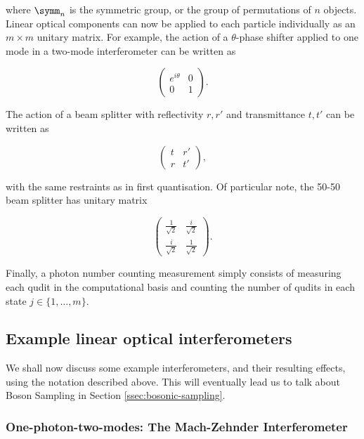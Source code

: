 \noindent where $\symm_n$ is the symmetric group, or the group of permutations of $n$ objects. Linear optical components can now be applied to each particle individually as an $m \times m$ unitary matrix. For example, the action of a $\theta$-phase shifter applied to one mode in a two-mode interferometer can be written as

\begin{equation}
\begin{pmatrix}
e^{i\theta} & 0\\
0 & 1
\end{pmatrix}.
\end{equation}

\noindent The action of a beam splitter with reflectivity $r, r'$ and transmittance $t, t'$ can be written as

\begin{equation}
\begin{pmatrix}
t & r'\\
r & t'
\end{pmatrix},
\end{equation}

\noindent with the same restraints as in first quantisation. Of particular note, the 50-50 beam splitter has unitary matrix

\begin{equation}
\begin{pmatrix}
\frac{1}{\sqrt{2}} & \frac{i}{\sqrt{2}}\\
\frac{i}{\sqrt{2}} & \frac{1}{\sqrt{2}}
\end{pmatrix}.
\end{equation}

Finally, a photon number counting measurement simply consists of measuring each qudit in the computational basis and counting the number of qudits in each state $j \in \{1,\dots,m\}$.

\subsection{Example linear optical interferometers}
\label{ssec:example-interferometers}

We shall now discuss some example interferometers, and their resulting effects, using the notation described above. This will eventually lead us to talk about Boson Sampling in Section \ref{ssec:bosonic-sampling}.

\subsubsection{One-photon-two-modes: The Mach-Zehnder Interferometer}

